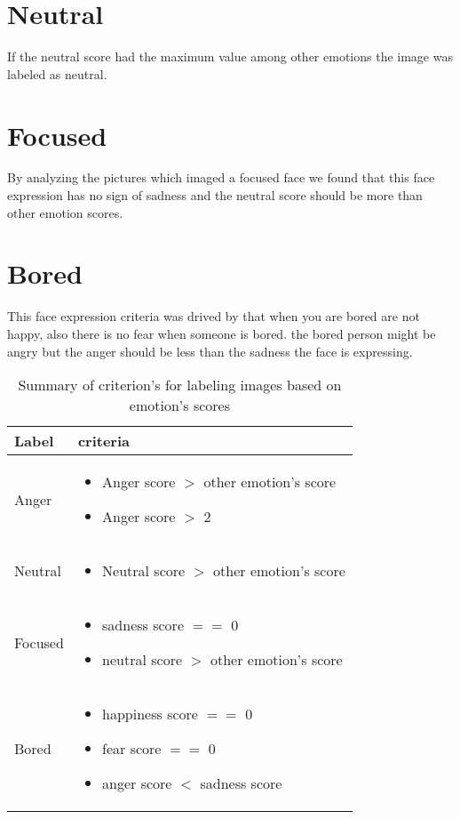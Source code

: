 \documentclass[]{report}
\begin{document}
\section{Neutral}
If the neutral score had the maximum value among other emotions the image was labeled as neutral.

\section{Focused}
By analyzing the pictures which imaged a focused face we found that this face expression has no sign of sadness and the neutral score should be more than other emotion scores.

\section{Bored}
This face expression criteria was drived by that when you are bored are not happy, also there is no fear when someone is bored. the bored person might be angry but the anger should be less than the sadness the face is expressing.

\begin{table}[h]
	\centering
	\caption{Summary of criterion's for labeling images based on emotion's scores}
	\begin{tabular}{|m{2cm}|m{8cm}|}
		\hline
		Label & criteria \\ \hline
		Anger & \begin{itemize}
			\item Anger score $>$ other emotion's score
			\item Anger score $>$ 2
		\end{itemize} \\ \hline
		Neutral & \begin{itemize}
			\item Neutral score $>$ other emotion's score
		\end{itemize} \\ \hline
		Focused & \begin{itemize}
			\item sadness score $==$ 0
			\item neutral score $>$ other emotion's score
		\end{itemize} \\ \hline
		Bored & \begin{itemize}
			\item happiness score $==$ 0
			\item fear score $==$ 0
			\item anger score $<$ sadness score
		\end{itemize} \\ \hline
	\end{tabular}
\end{table}
\end{document}
